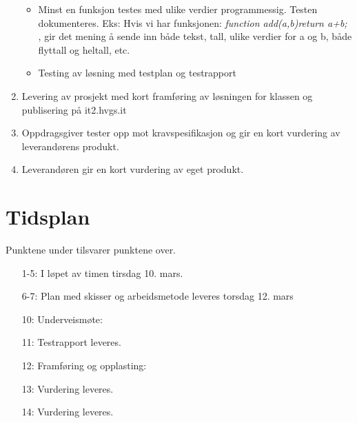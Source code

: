 \documentclass[11pt]{article} %
\begin{document}
\begin{enumerate}
                \begin{itemize}
                \item Minst en funksjon testes med ulike verdier programmessig. Testen dokumenteres. Eks: Hvis vi har funksjonen: \textit{function add(a,b){return a+b;} } , gir det mening å sende inn både tekst, tall, ulike verdier for a og b, både flyttall og heltall, etc.
                \item Testing av løsning med testplan og testrapport
            \end{itemize}
            \item Levering av prosjekt med kort framføring av løsningen for klassen og publisering på it2.hvgs.it
            \item Oppdragsgiver tester opp mot kravspesifikasjon og gir en kort vurdering av leverandørens produkt.
            \item Leverandøren gir en kort vurdering av eget produkt.
        \end{enumerate}
\section{Tidsplan}
    Punktene under tilsvarer punktene over.
    \begin{itemize}
        \item[1-5:] I løpet av timen tirsdag 10. mars.
        \item[6-7:] Plan med skisser og arbeidsmetode leveres torsdag 12. mars
        \item[10:] Underveismøte: 
        \item[11:] Testrapport leveres.
        \item[12:] Framføring og opplasting: 
        \item[13:] Vurdering leveres.
        \item[14:] Vurdering leveres.    
    \end{itemize}
\end{document}
